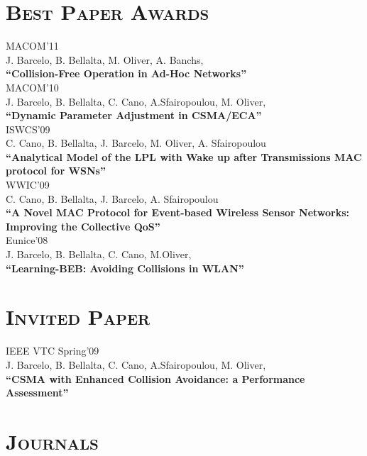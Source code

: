 \documentclass[line,margin]{res}
\begin{document}
\begin{resume}
\section{\textsc{Best Paper Awards}}

\hfill {MACOM'11} \\
J. Barcelo, B. Bellalta,  M. Oliver, A. Banchs, \\
\textbf{``Collision-Free Operation in Ad-Hoc Networks''}\\

\hfill {MACOM'10} \\
J. Barcelo, B. Bellalta,  C. Cano, A.Sfairopoulou, M. Oliver,\\
\textbf{``Dynamic Parameter Adjustment in CSMA/ECA''}\\

\hfill {ISWCS'09} \\
C. Cano, B. Bellalta, J. Barcelo, M. Oliver, A. Sfairopoulou\\
\textbf{``Analytical Model of the LPL with Wake up after Transmissions MAC protocol for WSNs''}\\

\hfill {WWIC'09} \\
C. Cano, B. Bellalta, J. Barcelo, A. Sfairopoulou\\
\textbf{``A Novel MAC Protocol for Event-based Wireless Sensor Networks: Improving the Collective QoS''}\\

\hfill {Eunice'08 } \\
J. Barcelo, B. Bellalta,  C. Cano, M.Oliver,\\
\textbf{``Learning-BEB: Avoiding Collisions in WLAN''}\\

\section{\textsc{Invited Paper}}

\hfill {IEEE VTC Spring'09} \\
J. Barcelo, B. Bellalta,  C. Cano, A.Sfairopoulou, M. Oliver,\\
\textbf{``CSMA with Enhanced Collision Avoidance: a Performance Assessment''}\\

\section{\textsc{Journals}}


\end{resume}
\end{document}

